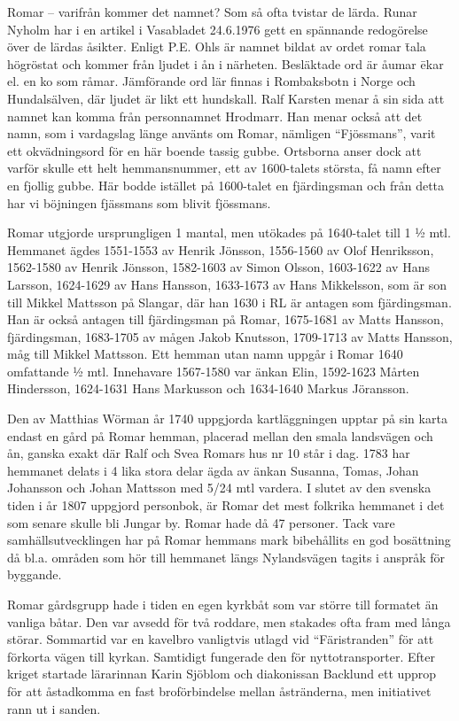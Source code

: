 
Romar – varifrån kommer det namnet? Som så ofta tvistar de lärda. Runar Nyholm har i en artikel i Vasabladet 24.6.1976 gett en spännande redogörelse över de lärdas åsikter. Enligt P.E. Ohls är namnet bildat av ordet romar \= tala högröstat och kommer från ljudet i ån i närheten. Besläktade ord är åumar \= ekar el. en ko som råmar. Jämförande ord lär finnas i Rombaksbotn i Norge och Hundalsälven, där ljudet är likt ett hundskall. Ralf Karsten menar å sin sida att namnet kan komma från personnamnet Hrodmarr. Han menar också att det namn, som i vardagslag länge använts om Romar, nämligen ``Fjössmans'', varit ett okvädningsord för en här boende tassig gubbe. Ortsborna anser dock att varför skulle ett helt hemmansnummer, ett av 1600-talets största, få namn efter en fjollig gubbe. Här bodde istället på 1600-talet en fjärdingsman och från detta har vi böjningen fjässmans som blivit fjössmans.

Romar utgjorde ursprungligen 1 mantal, men utökades på 1640-talet till 1 ½ mtl. Hemmanet ägdes 1551-1553 av Henrik Jönsson,  1556-1560 av Olof Henriksson, 1562-1580 av Henrik Jönsson, 1582-1603 av Simon Olsson, 1603-1622 av Hans Larsson, 1624-1629 av Hans Hansson, 1633-1673 av Hans Mikkelsson, som är son till Mikkel Mattsson på Slangar, där han 1630 i RL är antagen som fjärdingsman. Han är också antagen till fjärdingsman på Romar, 1675-1681 av Matts Hansson, fjärdingsman, 1683-1705 av mågen Jakob Knutsson, 1709-1713 av Matts Hansson, måg till Mikkel Mattsson. Ett hemman utan namn uppgår i Romar 1640 omfattande ½ mtl. Innehavare 1567-1580 var änkan Elin, 1592-1623 Mårten Hindersson, 1624-1631 Hans Markusson och 1634-1640 Markus Jöransson.

Den av Matthias Wörman år 1740 uppgjorda kartläggningen upptar på sin karta endast en gård på Romar hemman, placerad mellan den smala landsvägen och ån, ganska exakt där Ralf och Svea Romars hus nr 10 står i dag. 1783 har hemmanet delats i 4 lika stora delar ägda av änkan Susanna, Tomas, Johan Johansson och Johan Mattsson med 5/24 mtl vardera. I slutet av den svenska tiden i år 1807 uppgjord personbok, är Romar det mest folkrika hemmanet i det som senare skulle bli Jungar by. Romar hade då 47 personer. Tack vare samhällsutvecklingen har på Romar hemmans mark bibehållits en god bosättning då bl.a. områden som hör till hemmanet längs Nylandsvägen tagits i anspråk för byggande.

Romar gårdsgrupp hade i tiden en egen kyrkbåt som var större till formatet än vanliga båtar. Den var avsedd för två roddare, men stakades ofta fram med långa störar. Sommartid var en kavelbro vanligtvis utlagd vid ``Färistranden'' för att förkorta vägen till kyrkan. Samtidigt fungerade den för nyttotransporter. Efter kriget startade lärarinnan Karin Sjöblom och diakonissan Backlund ett upprop för att åstadkomma en fast broförbindelse mellan åstränderna, men initiativet rann ut i sanden.

